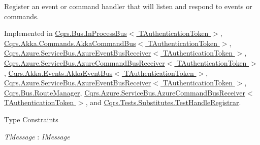 Register an event or command handler that will listen and respond to events or commands. 



Implemented in \hyperlink{classCqrs_1_1Bus_1_1InProcessBus_a62171e3c6d155cfdfd921b07b4909adf}{Cqrs.\+Bus.\+In\+Process\+Bus$<$ T\+Authentication\+Token $>$}, \hyperlink{classCqrs_1_1Akka_1_1Commands_1_1AkkaCommandBus_adc21072d2b02c745747c4d585a53dba3}{Cqrs.\+Akka.\+Commands.\+Akka\+Command\+Bus$<$ T\+Authentication\+Token $>$}, \hyperlink{classCqrs_1_1Azure_1_1ServiceBus_1_1AzureEventBusReceiver_a0c4ab01eece7025add9aa9ab4d23111d}{Cqrs.\+Azure.\+Service\+Bus.\+Azure\+Event\+Bus\+Receiver$<$ T\+Authentication\+Token $>$}, \hyperlink{classCqrs_1_1Azure_1_1ServiceBus_1_1AzureCommandBusReceiver_a1c9aba2692f51b66921802333433e2f7}{Cqrs.\+Azure.\+Service\+Bus.\+Azure\+Command\+Bus\+Receiver$<$ T\+Authentication\+Token $>$}, \hyperlink{classCqrs_1_1Akka_1_1Events_1_1AkkaEventBus_a6795dfcaf611ce1b50310f442cef0546}{Cqrs.\+Akka.\+Events.\+Akka\+Event\+Bus$<$ T\+Authentication\+Token $>$}, \hyperlink{classCqrs_1_1Azure_1_1ServiceBus_1_1AzureEventBusReceiver_a0c4ab01eece7025add9aa9ab4d23111d}{Cqrs.\+Azure.\+Service\+Bus.\+Azure\+Event\+Bus\+Receiver$<$ T\+Authentication\+Token $>$}, \hyperlink{classCqrs_1_1Bus_1_1RouteManager_aeb620222dd0351a6d3848caf93e29954}{Cqrs.\+Bus.\+Route\+Manager}, \hyperlink{classCqrs_1_1Azure_1_1ServiceBus_1_1AzureCommandBusReceiver_a1c9aba2692f51b66921802333433e2f7}{Cqrs.\+Azure.\+Service\+Bus.\+Azure\+Command\+Bus\+Receiver$<$ T\+Authentication\+Token $>$}, and \hyperlink{classCqrs_1_1Tests_1_1Substitutes_1_1TestHandleRegistrar_a8eb57abc3420b0968c08c05204caa25c}{Cqrs.\+Tests.\+Substitutes.\+Test\+Handle\+Registrar}.

\begin{Desc}
\item[Type Constraints]\begin{description}
\item[{\em T\+Message} : {\em I\+Message}]\end{description}
\end{Desc}
